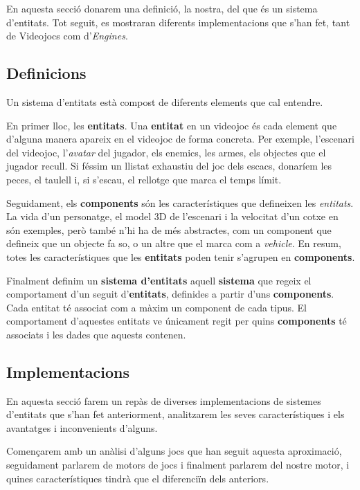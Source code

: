 En aquesta secció donarem una definició, la nostra, del que és un sistema d'entitats. Tot seguit, es mostraran diferents implementacions que s'han fet, tant de Videojocs com d'{\em Engines}.

\subsection{Definicions}

Un sistema d'entitats està compost de diferents elements que cal entendre.

En primer lloc, les {\bf entitats}. Una {\bf entitat} en un videojoc és cada element que d'alguna manera apareix en el videojoc de forma concreta. Per exemple, l'escenari del videojoc, l'{\em avatar} del jugador, els enemics, les armes, els objectes que el jugador recull. Si féssim un llistat exhaustiu del joc dels escacs, donaríem les peces, el taulell i, si s'escau, el rellotge que marca el temps límit.

Seguidament, els {\bf components} són les característiques que defineixen les {\em entitats}. La vida d'un personatge, el model 3D de l'escenari i la velocitat d'un cotxe en són exemples, però també n'hi ha de més abstractes, com un component que defineix que un objecte fa so, o un altre que el marca com a {\em vehicle}. En resum, totes les característiques que les {\bf entitats} poden tenir s'agrupen en {\bf components}.

Finalment definim un {\bf sistema d'entitats} aquell {\bf sistema} que regeix el comportament d'un seguit d'{\bf entitats}, definides a partir d'uns {\bf components}. Cada entitat té associat com a màxim un component de cada tipus. El comportament d'aquestes entitats ve únicament regit per quins {\bf components} té associats i les dades que aquests contenen.

\subsection{Implementacions}

En aquesta secció farem un repàs de diverses implementacions de sistemes d'entitats que s'han fet anteriorment, analitzarem les seves característiques i els avantatges i inconvenients d'alguns.

Començarem amb un anàlisi d'alguns jocs que han seguit aquesta aproximació, seguidament parlarem de motors de jocs i finalment parlarem del nostre motor, i quines característiques tindrà que el diferenciïn dels anteriors.

